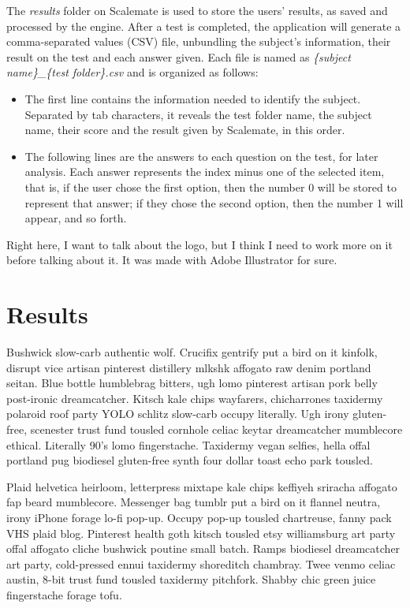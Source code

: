 \documentclass[12pt, a4paper, twoside]{article}
\begin{document}
The \textit{results} folder on Scalemate is used to store the users' results, as saved and processed by the engine. After a test is completed, the application will generate a comma-separated values (CSV) file, unbundling the subject's information, their result on the test and each answer given. Each file is named as \textit{\{subject name\}\_\{test folder\}.csv} and is organized as follows:

\begin{itemize}
\item The first line contains the information needed to identify the subject. Separated by tab characters, it reveals the test folder name, the subject name, their score and the result given by Scalemate, in this order.
\item The following lines are the answers to each question on the test, for later analysis. Each answer represents the index minus one of the selected item, that is, if the user chose the first option, then the number 0 will be stored to represent that answer; if they chose the second option, then the number 1 will appear, and so forth.
\end{itemize}

Right here, I want to talk about the logo, but I think I need to work more on it before talking about it. It was made with Adobe Illustrator for sure.

\section{Results}

Bushwick slow-carb authentic wolf. Crucifix gentrify put a bird on it kinfolk, disrupt vice artisan pinterest distillery mlkshk affogato raw denim portland seitan. Blue bottle humblebrag bitters, ugh lomo pinterest artisan pork belly post-ironic dreamcatcher. Kitsch kale chips wayfarers, chicharrones taxidermy polaroid roof party YOLO schlitz slow-carb occupy literally. Ugh irony gluten-free, scenester trust fund tousled cornhole celiac keytar dreamcatcher mumblecore ethical. Literally 90's lomo fingerstache. Taxidermy vegan selfies, hella offal portland pug biodiesel gluten-free synth four dollar toast echo park tousled.

Plaid helvetica heirloom, letterpress mixtape kale chips keffiyeh sriracha affogato fap beard mumblecore. Messenger bag tumblr put a bird on it flannel neutra, irony iPhone forage lo-fi pop-up. Occupy pop-up tousled chartreuse, fanny pack VHS plaid blog. Pinterest health goth kitsch tousled etsy williamsburg art party offal affogato cliche bushwick poutine small batch. Ramps biodiesel dreamcatcher art party, cold-pressed ennui taxidermy shoreditch chambray. Twee venmo celiac austin, 8-bit trust fund tousled taxidermy pitchfork. Shabby chic green juice fingerstache forage tofu.
\end{document}
